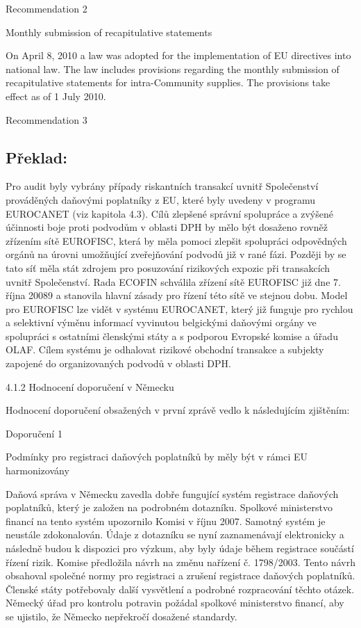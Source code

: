 \documentclass[10pt]{article}
\begin{document}
Recommendation 2



Monthly submission of recapitulative statements

On April 8, 2010 a law was adopted for the implementation of EU directives into national law.
The law includes provisions regarding the monthly submission of recapitulative statements for intra-Community supplies.
The provisions take effect as of 1 July 2010.


Recommendation 3



\pagebreak

\subsection*{Překlad:}

Pro audit byly vybrány případy riskantních transakcí uvnitř Společenství prováděných daňovými poplatníky z EU, které byly uvedeny v programu EUROCANET (viz kapitola 4.3).
Cílů zlepšené správní spolupráce a zvýšené účinnosti boje proti podvodům v oblasti DPH by mělo být dosaženo rovněž zřízením sítě EUROFISC, která by měla pomoci zlepšit spolupráci odpovědných orgánů na úrovni umožňující zveřejňování podvodů již v rané fázi.
Později by se tato síť měla stát zdrojem pro posuzování rizikových expozic při transakcích uvnitř Společenství.
Rada ECOFIN schválila zřízení sítě EUROFISC již dne 7. října 20089 a stanovila hlavní zásady pro řízení této sítě ve stejnou dobu.
Model pro EUROFISC lze vidět v systému EUROCANET, který již funguje pro rychlou a selektivní výměnu informací vyvinutou belgickými daňovými orgány ve spolupráci s ostatními členskými státy a s podporou Evropské komise a úřadu OLAF.
Cílem systému je odhalovat rizikové obchodní transakce a subjekty zapojené do organizovaných podvodů v oblasti DPH.


4.1.2 Hodnocení doporučení v Německu



Hodnocení doporučení obsažených v první zprávě vedlo k následujícím zjištěním:



Doporučení 1



Podmínky pro registraci daňových poplatníků by měly být v rámci EU harmonizovány

Daňová správa v Německu zavedla dobře fungující systém registrace daňových poplatníků, který je založen na podrobném dotazníku.
Spolkové ministerstvo financí na tento systém upozornilo Komisi v říjnu 2007.
Samotný systém je neustále zdokonalován.
Údaje z dotazníku se nyní zaznamenávají elektronicky a následně budou k dispozici pro výzkum, aby byly údaje během registrace součástí řízení rizik.
Komise předložila návrh na změnu nařízení č. 1798/2003. Tento návrh obsahoval společné normy pro registraci a zrušení registrace daňových poplatníků.
Členské státy potřebovaly další vysvětlení a podrobné rozpracování těchto otázek.
Německý úřad pro kontrolu potravin požádal spolkové ministerstvo financí, aby se ujistilo, že Německo nepřekročí dosažené standardy.
\end{document}
